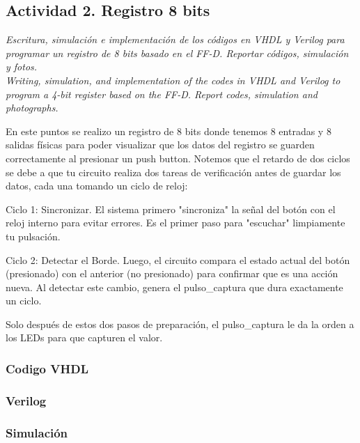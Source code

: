 \subsection*{Actividad 2. Registro 8 bits}

\textit{\textcolor{Verde}{Escritura, simulación e implementación de los códigos en VHDL y Verilog para programar un registro de 8 bits basado en el FF-D. Reportar códigos, simulación y fotos. \\
Writing, simulation, and implementation of the codes in VHDL and Verilog to program a 4-bit register based on the FF-D. Report codes, simulation and photographs.}}

En este puntos se realizo un registro de 8 bits donde tenemos 8 entradas y 8 salidas físicas para poder visualizar que los datos del registro se guarden correctamente al presionar un push button. Notemos que el retardo de dos ciclos se debe a que tu circuito realiza dos tareas de verificación antes de guardar los datos, cada una tomando un ciclo de reloj:

Ciclo 1: Sincronizar. El sistema primero "sincroniza" la señal del botón con el reloj interno para evitar errores. Es el primer paso para "escuchar" limpiamente tu pulsación.

Ciclo 2: Detectar el Borde. Luego, el circuito compara el estado actual del botón (presionado) con el anterior (no presionado) para confirmar que es una acción nueva. Al detectar este cambio, genera el pulso\_captura que dura exactamente un ciclo.

Solo después de estos dos pasos de preparación, el pulso\_captura le da la orden a los LEDs para que capturen el valor.

\subsubsection*{Codigo VHDL}



\subsubsection*{Verilog}



\subsubsection*{Simulación}

